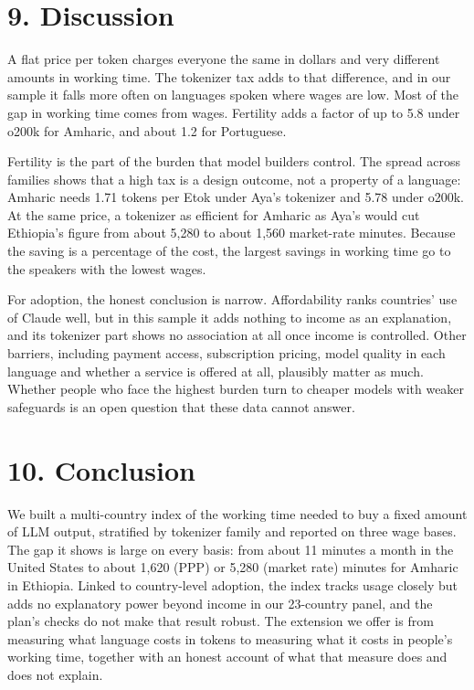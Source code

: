 \documentclass[11pt]{article}
\begin{document}
\section{9. Discussion}

A flat price per token charges everyone the same in dollars and very different amounts in working time. The tokenizer tax adds to that difference, and in our sample it falls more often on languages spoken where wages are low. Most of the gap in working time comes from wages. Fertility adds a factor of up to 5.8 under o200k for Amharic, and about 1.2 for Portuguese.

Fertility is the part of the burden that model builders control. The spread across families shows that a high tax is a design outcome, not a property of a language: Amharic needs 1.71 tokens per Etok under Aya's tokenizer and 5.78 under o200k. At the same price, a tokenizer as efficient for Amharic as Aya's would cut Ethiopia's figure from about 5,280 to about 1,560 market-rate minutes. Because the saving is a percentage of the cost, the largest savings in working time go to the speakers with the lowest wages.

For adoption, the honest conclusion is narrow. Affordability ranks countries' use of Claude well, but in this sample it adds nothing to income as an explanation, and its tokenizer part shows no association at all once income is controlled. Other barriers, including payment access, subscription pricing, model quality in each language and whether a service is offered at all, plausibly matter as much. Whether people who face the highest burden turn to cheaper models with weaker safeguards is an open question that these data cannot answer.

\section{10. Conclusion}

We built a multi-country index of the working time needed to buy a fixed amount of LLM output, stratified by tokenizer family and reported on three wage bases. The gap it shows is large on every basis: from about 11 minutes a month in the United States to about 1,620 (PPP) or 5,280 (market rate) minutes for Amharic in Ethiopia. Linked to country-level adoption, the index tracks usage closely but adds no explanatory power beyond income in our 23-country panel, and the plan's checks do not make that result robust. The extension we offer is from measuring what language costs in tokens to measuring what it costs in people's working time, together with an honest account of what that measure does and does not explain.
\end{document}
